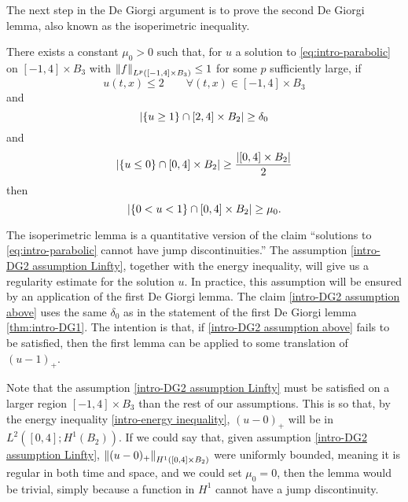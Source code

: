 The next step in the De Giorgi argument is to prove the second De Giorgi lemma, also known as the isoperimetric inequality.  
\begin{lemma} \label{thm:intro-DG2}
There exists a constant $\mu_0 > 0$ such that, for $u$ a solution to \eqref{eq:intro-parabolic} on $[-1,4]\times B_3$ with $\left\lVert f\right\rVert_{L^p([-1,4]\times B_3)} \leq 1$ for some $p$ sufficiently large, if
\begin{equation} \label{intro-DG2 assumption Linfty} u(t,x) \leq 2 \qquad \forall (t,x) \in [-1,4] \times B_3 \end{equation}
and
\begin{equation} \label{intro-DG2 assumption above} \left\lvert \{u \geq 1\} \cap [2,4] \times B_2 \right\rvert \geq \delta_0 \end{equation}
and
\begin{equation} \label{intro-DG2 assumption below} \left\lvert \{u \leq 0\} \cap [0,4] \times B_2 \right\rvert \geq \frac{\left\lvert [0,4]\times B_2 \right\rvert}{2} \end{equation}
then
\begin{equation} \label{intro-DG2 assumption middle} \left\lvert \{0 < u < 1\} \cap [0,4] \times B_2 \right\rvert \geq \mu_0. \end{equation}
\end{lemma}

The isoperimetric lemma is a quantitative version of the claim ``solutions to \eqref{eq:intro-parabolic} cannot have jump discontinuities.''  The assumption \eqref{intro-DG2 assumption Linfty}, together with the energy inequality, will give us a regularity estimate for the solution $u$.  In practice, this assumption will be ensured by an application of the first De Giorgi lemma.  The claim \eqref{intro-DG2 assumption above} uses the same $\delta_0$ as in the statement of the first De Giorgi lemma \ref{thm:intro-DG1}.  The intention is that, if \eqref{intro-DG2 assumption above} fails to be satisfied, then the first lemma can be applied to some translation of $(u-1)_+$.  

Note that the assumption \eqref{intro-DG2 assumption Linfty} must be satisfied on a larger region $[-1,4]\times B_3$ than the rest of our assumptions.  This is so that, by the energy inequality \eqref{intro-energy inequality}, $(u-0)_+$ will be in $L^2([0,4]; H^1(B_2))$.  If we could say that, given assumption \eqref{intro-DG2 assumption Linfty}, $\left\lVert(u-0)_+\right\rVert_{H^1([0,4] \times B_2)}$ were uniformly bounded, meaning it is regular in both time and space, and we could set $\mu_0 = 0$, then the lemma would be trivial, simply because a function in $H^1$ cannot have a jump discontinuity.  

